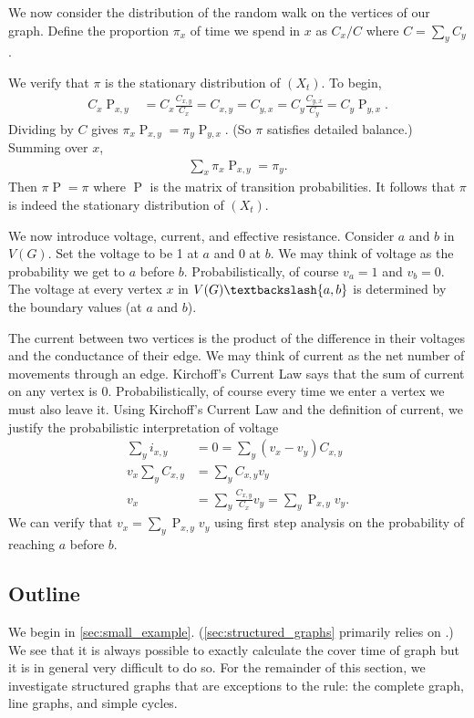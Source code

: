 \documentclass[12pt]{article}
\theoremstyle{definition}
\DeclareMathOperator{\pr}{\mathrm{P}}		     %
\begin{document}
We now consider the distribution of the random
walk on the vertices of our graph.
Define the proportion $\pi_x$ of time we spend in $x$
as $C_x/C$ where $C=\sum_y C_y$.

We verify that $\pi$ is the stationary distribution
of $(X_t)$.
To begin,
\begin{align}
C_x \pr_{x,y} &= C_x \frac{C_{x,y}}{C_x} = C_{x,y} = C_{y,x} 
= C_y \frac{C_{y,x}}{C_y} = C_y \pr_{y,x}. \nonumber
\end{align}
Dividing by $C$ gives $\pi_x \pr_{x,y} = \pi_y \pr_{y,x}$.
(So $\pi$ satisfies detailed balance.)
Summing over $x$,
\begin{align}
\sum_x \pi_x \pr_{x,y} = \pi_y . \nonumber
\end{align}
Then $\pi \pr = \pi$ where $\pr$ is the matrix of transition probabilities.
It follows that $\pi$ is indeed the stationary distribution of $(X_t)$.

We now introduce voltage, current, and effective resistance.
Consider $a$ and $b$ in $V(G)$.
Set the voltage to be 1 at $a$ and 0 at $b$.
We may think of voltage as the probability we get to $a$ before $b$.
Probabilistically, of course $v_a = 1$ and $v_b=0$.
The voltage at every vertex $x$ in  $V(G) \textbackslash \{a,b\}$
is determined by the boundary values (at $a$ and $b$).

The current between two vertices is the product of the
difference in their voltages and the conductance of their edge.
We may think of current as the net number of movements through an edge.
Kirchoff's Current Law says that the sum of current on any vertex is 0.
Probabilistically, of course every time we enter a vertex we must also leave it.
Using Kirchoff's Current Law and the definition of current,
we justify the probabilistic interpretation of voltage
\begin{align}
\sum_y i_{x,y} &= 0 = \sum_y (v_x - v_y)C_{x,y} \nonumber \\
v_x \sum_y C_{x,y} &= \sum_y C_{x,y} v_y \nonumber \\
v_x &= \sum_y \frac{C_{x,y}}{C_x} v_y = \sum_y \pr_{x,y} v_y. \nonumber
\end{align}
We can verify that $v_x = \sum_y \pr_{x,y} v_y$
using first step analysis on the probability of reaching $a$ before $b$.

\subsection{Outline}

We begin in \cref{sec:small_example}.
(\cref{sec:structured_graphs} primarily relies on \cite{BH94}.)
We see that it is always possible to exactly calculate the cover time
of graph but it is in general very difficult to do so.
For the remainder of this section, we investigate
structured graphs that are exceptions to the rule:
the complete graph, line graphs, and simple cycles.
\end{document}
